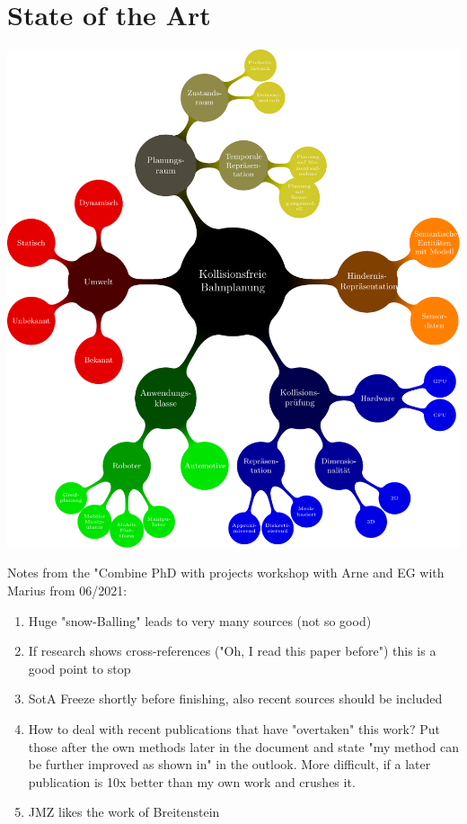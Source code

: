 \chapter{State of the Art}
\label{chap:relatedwork}

\includegraphics[width=1\textwidth]{04_images/sota_taxonomy}

Notes from the "Combine PhD with projects workshop with Arne and EG with Marius from 06/2021:
\begin{enumerate}
    \item Huge "snow-Balling" leads to very many sources (not so good)
    \item If research shows cross-references ("Oh, I read this paper before") this is a good point to stop
    \item SotA Freeze shortly before finishing, also recent sources should be included
    \item How to deal with recent publications that have "overtaken" this work? Put those after the own methods later in the document and state "my method can be further improved as shown in" in the outlook. More difficult, if a later publication is 10x better than my own work and crushes it.
    \item JMZ likes the work of Breitenstein
    
\end{enumerate}

